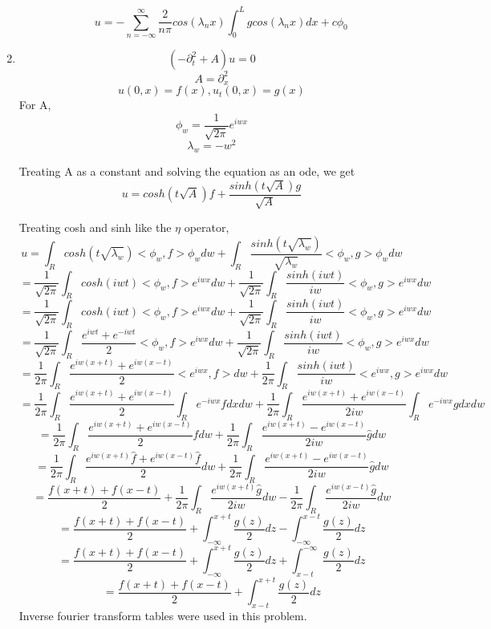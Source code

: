 \documentclass[a4paper,12 pt]{article}
\begin{document}
\begin{enumerate}
\begin{enumerate}
\[u =-\sum_{n=-\infty }^{\infty} \frac{2}{n\pi}cos(\lambda_n x)\int_{0}^{L} gcos(\lambda_n x) dx +c \phi_0\] 
	
	\end{enumerate}
	\item
	\[ (-\partial_t^2 +A)u=0\]
	\[A= \partial_x^2\]
	\[u(0,x)= f(x),u_t(0,x)= g(x) \]
	For A, 
	\[\phi_w =  \frac{1}{\sqrt{2\pi}}e^{iwx}\]
	\[\lambda_w= -w^2\]
	
	Treating A as a constant and solving the equation as an ode, we get
	\[u= cosh(t\sqrt{A})f +\frac{sinh(t\sqrt{A})g}{\sqrt{A}} \]
	
	Treating cosh and sinh like the $\eta$ operator,
	\[u= \int_{R} cosh(t\sqrt{\lambda_w})<\phi_w,f>\phi_wdw +\int_{R} \frac{sinh(t\sqrt{\lambda_w})}{\sqrt{\lambda_w}}<\phi_w,g>\phi_wdw  \]
	\[= \frac{1}{\sqrt{2\pi}} \int_{R} cosh(iwt)<\phi_w,f>e^{iwx}dw +\frac{1}{\sqrt{2\pi}}\int_{R} \frac{sinh(iwt)}{iw}<\phi_w,g>e^{iwx}dw  \]
		\[=  \frac{1}{\sqrt{2\pi}} \int_{R} cosh(iwt)<\phi_w,f>e^{iwx}dw +\frac{1}{\sqrt{2\pi}}\int_{R} \frac{sinh(iwt)}{iw}<\phi_w,g>e^{iwx}dw  \]
			\[= \frac{1}{\sqrt{2\pi}}\int_{R} \frac{e^{iwt}+e^{-iwt}}{2}<\phi_w,f>e^{iwx}dw +\frac{1}{\sqrt{2\pi}}\int_{R} \frac{sinh(iwt)}{iw}<\phi_w,g>e^{iwx}dw  \]
		\[=\frac{1}{2\pi} \int_{R} \frac{e^{iw(x+t)}+e^{iw(x-t)}}{2}<e^{iwx},f>dw +\frac{1}{2\pi}\int_{R} \frac{sinh(iwt)}{iw}<e^{iwx},g>e^{iwx}dw  \]
			\[= \frac{1}{2\pi}\int_{R} \frac{e^{iw(x+t)}+e^{iw(x-t)}}{2} \int_{R} e^{-iwx}f dx dw +\frac{1}{2\pi}\int_{R} \frac{e^{iw(x+t)}+e^{iw(x-t)}}{2iw}\int_{R} e^{-iwx}g  dx dw  \]
	\[= \frac{1}{2\pi}\int_{R} \frac{e^{iw(x+t)}+e^{iw(x-t)}}{2} \hat{f} dw +\frac{1}{2\pi}\int_{R} \frac{e^{iw(x+t)}-e^{iw(x-t)}}{2iw} \hat{g} dw  \]
		\[= \frac{1}{2\pi}\int_{R} \frac{e^{iw(x+t)}\hat{f}+e^{iw(x-t)}\hat{f}}{2}  dw +\frac{1}{2\pi}\int_{R} \frac{e^{iw(x+t)}-e^{iw(x-t)}}{2iw} \hat{g} dw  \]
	\[= \frac{f(x+t)+f(x-t)}{2}  + \frac{1}{2\pi}\int_{R} \frac{e^{iw(x+t)}\hat{g}}{2iw}  dw - \frac{1}{2\pi}\int_{R} \frac{e^{iw(x-t)}\hat{g}}{2iw}  dw    \]
		\[= \frac{f(x+t)+f(x-t)}{2}  + \int_{-\infty}^{x+t} \frac{g(z)}{2}  dz  - \int_{-\infty}^{x-t} \frac{g(z)}{2}  dz    \]
				\[= \frac{f(x+t)+f(x-t)}{2}  + \int_{-\infty}^{x+t} \frac{g(z)}{2}  dz  + \int_{x-t}^{-\infty} \frac{g(z)}{2}  dz    \]
								\[= \frac{f(x+t)+f(x-t)}{2}  + \int_{x-t}^{x+t} \frac{g(z)}{2}  dz     \]
Inverse fourier transform tables were used in this problem.
	\end{enumerate} 
	
\end{document}
